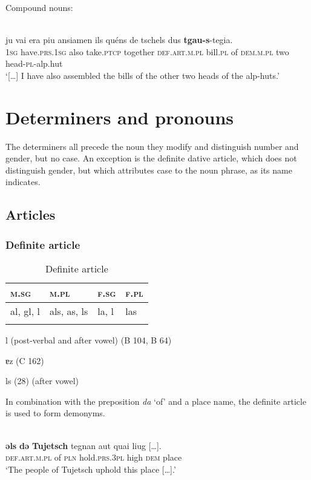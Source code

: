 Compound nouns:

\ea\label{ex: }
\\
\gll  […] ju vai era piu ansiamen ils quéns de tschels dus \textbf{tgau}\textbf{-s}-tegia.  \\
    […] \textsc{1sg} have.\textsc{prs.1sg} also take.\textsc{ptcp} together \textsc{def.art.m.pl} bill.\textsc{pl} of \textsc{dem.m.pl} two head-\textsc{pl}-alp.hut \\
\glt `[…] I have also assembled the bills of the other two heads of the alp-huts.'
\z


\section{Determiners and pronouns}
The determiners all precede the noun they modify and distinguish number and gender, but no case. An exception is the definite dative article, which does not distinguish gender, but which attributes case to the noun phrase, as its name indicates.

\subsection{Articles}

\subsubsection{Definite article}

\begin{table}
\caption{Definite article}
\label{tab:1:defart}
 \begin{tabular}{llll}
  \lsptoprule
   \textsc{m.sg}   &  \textsc{m.pl} & \textsc{f.sg} & \textsc{f.pl}\\ 
  \midrule
  al, gl, l  & als, as, ls & la, l &  las\\
    \lspbottomrule
 \end{tabular}
\end{table}

l (post-verbal and after vowel) (B 104, B 64)

ɐz (C 162)

ls (28) (after vowel)

In combination with the preposition \textit{da} ‘of’ and a place name, the definite article is used to form demonyms.

\ea\label{}
\\
\gll    \textbf{ǝls} \textbf{dǝ} \textbf{Tujetsch} tegnan aut quai liug […].\\
    \textsc{def.art.m.pl} of \textsc{pln} hold.\textsc{prs.3pl} high \textsc{dem} place\\
\glt `The people of Tujetsch uphold this place […].'
\z

